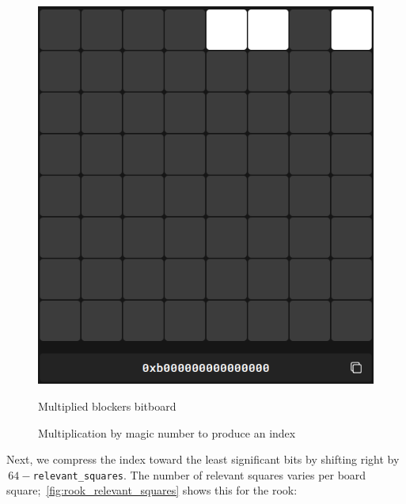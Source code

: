 \begin{figure}[H]
\begin{minipage}[c]{0.4\textwidth}
        \includegraphics[width=\textwidth]{Imagenes/magics_multiplied_blockers.png}
        \caption{Multiplied blockers bitboard}
    \end{minipage}
    \caption*{Multiplication by magic number to produce an index}\label{fig:magic_multiplication}
\end{figure}

\noindent Next, we compress the index toward the least significant bits by shifting right by \(\,64-\)\texttt{relevant\_squares}. The number of relevant squares varies per board square;~\cref{fig:rook_relevant_squares} shows this for the rook:

\vspace{1em}

